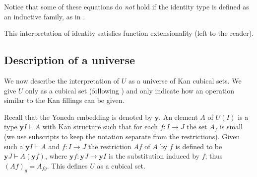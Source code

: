 \documentclass[10pt,a4paper]{article}
\newcommand{\CC}{{\mathcal C}}
\newcommand{\rup}[1]{#1{\uparrow}}
\newcommand{\rdo}[1]{#1{\downarrow}}
\newcommand{\OO}{O}
\newcommand{\yoneda}{\mathbf{y}}
\begin{document}
 Notice that some of these equations do {\em not} hold if the
identity type is defined as an inductive family, as in \cite{MLTT}.


\medskip

This interpretation of identity satisfies function extensionality
(left to the reader).


\subsection{Description of a universe}



We now describe the interpretation of $U$ as a universe of Kan cubical
sets.  We give $U$ only as a cubical set (following
\cite{HofmannStreicher}) and only indicate how an operation similar to
the Kan fillings can be given.

Recall that the Yoneda embedding is denoted by $\yoneda$.  An
element $A$ of $U(I)$ is a type $\yoneda I \vdash A$ with Kan
structure such that for each $f \colon I \to J$ the set $A_f$ is small
(we use subscripts to keep the notation separate from the
restrictions).  Given such a $\yoneda I \vdash A$ and $f \colon I \to
J$ the restriction $A f$ of $A$ by $f$ is defined to be $\yoneda J
\vdash A (\yoneda f)$, where $\yoneda f \colon \yoneda J \to \yoneda
I$ is the substitution induced by $f$; thus $(A f)_g = A_{f g}$.  This
defines $U$ as a cubical set.

\end{document}

